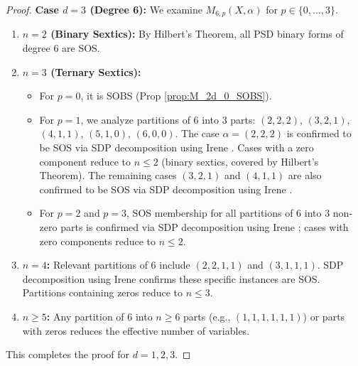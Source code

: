 \documentclass{article}
\begin{document}
\begin{proof}
\noindent \textbf{Case $d=3$ (Degree 6):}
We examine $M_{6,p}(X, \alpha)$ for $p \in \{0, \dots, 3\}$.
\begin{enumerate}
    \item \textbf{$n=2$ (Binary Sextics):} By Hilbert's Theorem, all PSD binary forms of degree 6 are SOS.
    \item \textbf{$n=3$ (Ternary Sextics):}
    \begin{itemize}
        \item For $p=0$, it is SOBS (Prop \ref{prop:M_2d_0_SOBS}).
        \item For $p=1$, we analyze partitions of 6 into 3 parts: $(2,2,2)$, $(3,2,1)$, $(4,1,1)$, $(5,1,0)$, $(6,0,0)$.
        The case $\alpha=(2,2,2)$ is confirmed to be SOS via SDP decomposition using Irene \cite{GMIr}. Cases with
        a zero component reduce to $n \leq 2$ (binary sextics, covered by Hilbert's Theorem). The remaining cases
        $(3,2,1)$ and $(4,1,1)$ are also confirmed to be SOS via SDP decomposition using Irene \cite{GMIr}.
        \item For $p=2$ and $p=3$, SOS membership for all partitions of 6 into 3 non-zero parts is confirmed
        via SDP decomposition using Irene \cite{GMIr}; cases with zero components reduce to $n \leq 2$.
    \end{itemize}
    \item \textbf{$n=4$:}
    Relevant partitions of 6 include $(2,2,1,1)$ and $(3,1,1,1)$. SDP decomposition using Irene \cite{GMIr} confirms these specific instances are SOS.
    Partitions containing zeros reduce to $n \leq 3$.
    \item \textbf{$n \geq 5$:}
    Any partition of 6 into $n \ge 6$ parts (e.g., $(1,1,1,1,1,1)$) or parts with zeros reduces the effective number of 
    variables.
\end{enumerate}
This completes the proof for $d=1, 2, 3$.
\end{proof}
\end{document}
